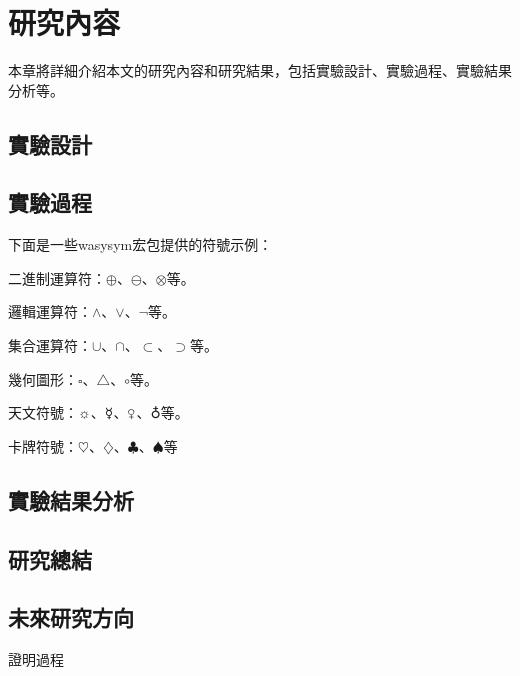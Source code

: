 \documentclass[writingLanguage=chinese,
    addPageTitle=on,
    addDeclaration=on,
    addMUSTlog=off,
    addFigTOC=on,   
    addTabTOC=on,
    refIndent=off,
    printMod=off,
]{.def/must}
\begin{document}
\txtHere{[1]}

\section{研究內容}

本章將詳細介紹本文的研究內容和研究結果，包括實驗設計、實驗過程、實驗結果分析等。

\subsection{實驗設計}

\txtHere{[1]}

\subsection{實驗過程}
下面是一些wasysym宏包提供的符號示例：

二進制運算符：$\oplus$、$\ominus$、$\otimes$等。

邏輯運算符：$\wedge$、$\vee$、$\neg$等。

集合運算符：$\cup$、$\cap$、$\subset$、$\supset$等。

幾何圖形：$\square$、$\triangle$、$\circ$等。

天文符號：$\sun$、$\mercury$、$\venus$、$\earth$等。

卡牌符號：$\heartsuit$、$\diamondsuit$、$\clubsuit$、$\spadesuit$等

\subsection{實驗結果分析}

\txtHere{[1]}


 
\subsection{研究總結}

\txtHere{[1]}

\subsection{未來研究方向}

\txtHere{[1]}



\addreference


\begin{appendix}
證明過程
\end{appendix}
\end{document}
